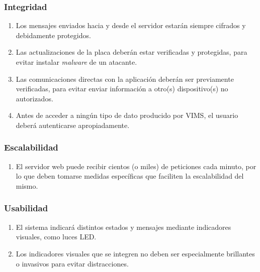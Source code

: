 \subsubsection{Integridad}
\begin{enumerate}[resume, label=\textbf{\texttt{RNF-\arabic*}}]
  \item\label{nf:enc} Los mensajes enviados hacia y desde el servidor estarán siempre
  cifrados y debidamente protegidos.
  \item\label{nf:ota-int} Las actualizaciones de la placa deberán estar verificadas
  y protegidas, para evitar instalar \textit{malware} de un atacante.
  \item\label{nf:s2a-int} Las comunicaciones directas con la aplicación deberán
  ser previamente verificadas, para evitar enviar información a otro(s) dispositivo(s)
  no autorizados.
  \item\label{nf:auth} Antes de acceder a ningún tipo de dato producido por \ac{VIMS},
  el usuario deberá autenticarse apropiadamente.
\end{enumerate}

\subsubsection{Escalabilidad}
\begin{enumerate}[resume, label=\textbf{\texttt{RNF-\arabic*}}]
  \item\label{nf:server-scalability} El servidor web puede recibir cientos (o miles)
  de peticiones cada minuto, por lo que deben tomarse medidas específicas que faciliten
  la escalabilidad del mismo.
\end{enumerate}

\subsubsection{Usabilidad}
\begin{enumerate}[resume, label=\textbf{\texttt{RNF-\arabic*}}]
  \item\label{nf:s-data} El sistema indicará distintos estados y mensajes mediante
  indicadores visuales, como luces LED. 
  \item\label{nf:led-bright} Los indicadores visuales que se integren no deben ser especialmente
  brillantes o invasivos para evitar distracciones.
\end{enumerate}
